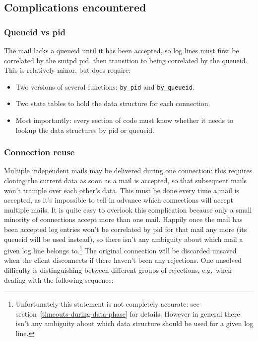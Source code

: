 \documentclass[a4paper,12pt,draft]{article}
\begin{document}
\subsection{Complications encountered}

\label{complications}


\subsubsection{Queueid vs pid}

The mail lacks a queueid until it has been accepted, so log lines must
first be correlated by the smtpd pid, then transition to being correlated
by the queueid.  This is relatively minor, but does require:

\begin{itemize}

    \item Two versions of several functions: \texttt{by\_pid} and
        \texttt{by\_queueid}.

    \item Two state tables to hold the data structure for each connection.

    \item Most importantly: every section of code must know whether it
        needs to lookup the data structures by pid or queueid.

\end{itemize}

\subsubsection{Connection reuse}

Multiple independent mails may be delivered during one connection: this
requires cloning the current data as soon as a mail is accepted, so that
subsequent mails won't trample over each other's data.  This must be done
every time a mail is accepted, as it's impossible to tell in advance which
connections will accept multiple mails.  It is quite easy to overlook this
complication because only a small minority of connections accept more than
one mail. Happily once the mail has been accepted log entries won't be
correlated by pid for that mail any more (its queueid will be used
instead), so there isn't any ambiguity about which mail a given log line
belongs to.\footnote{Unfortunately this statement is not completely
accurate: see section~\ref{timeouts-during-data-phase} for details.
However in general there isn't any ambiguity about which data structure
should be used for a given log line.}  The original connection will be
discarded unsaved when the client disconnects if there haven't been any
rejections.  One unsolved difficulty is
distinguishing between different groups of rejections, e.g.\ when dealing
with the following sequence:
\end{document}
